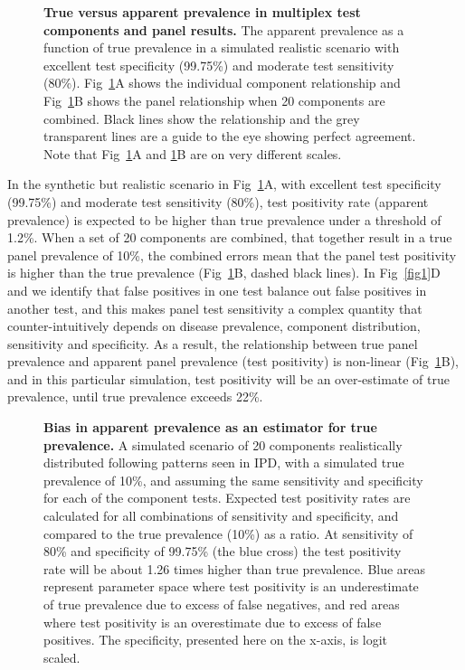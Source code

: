 \documentclass[10pt,letterpaper]{article}
\begin{document}
\begin{figure}[ht!]
\caption{{\bf True versus apparent prevalence in multiplex test components and panel results.}
The apparent prevalence as a function of true prevalence in a simulated realistic scenario with excellent test specificity (99.75\%) and moderate test sensitivity (80\%). Fig~\ref{fig3}A shows the individual component relationship and Fig~\ref{fig3}B shows the panel relationship when 20 components are combined. Black lines show the relationship and the grey transparent lines are a guide to the eye showing perfect agreement. Note that Fig~\ref{fig3}A and \ref{fig3}B are on very different scales.
}
\label{fig3}
\end{figure}

In the synthetic but realistic scenario in Fig~\ref{fig3}A, with excellent test specificity (99.75\%) and moderate test sensitivity (80\%), test positivity rate (apparent prevalence) is expected to be higher than true prevalence under a threshold of 1.2\%. When a set of 20 components are combined, that together result in a true panel prevalence of 10\%, the combined errors mean that the panel test positivity is higher than the true prevalence (Fig~\ref{fig3}B, dashed black lines). In Fig~\ref{fig1}D and  we identify that false positives in one test balance out false positives in another test, and this makes panel test sensitivity a complex quantity that counter-intuitively depends on disease prevalence, component distribution, sensitivity and specificity. As a result, the relationship between true panel prevalence and apparent panel prevalence (test positivity) is non-linear (Fig~\ref{fig3}B), and in this particular simulation, test positivity will be an over-estimate of true prevalence, until true prevalence exceeds 22\%.

\begin{figure}[ht!]
\caption{{\bf Bias in apparent prevalence as an estimator for true prevalence.}
A simulated scenario of 20 components realistically distributed following patterns seen in IPD, with a simulated true prevalence of 10\%, and assuming the same sensitivity and specificity for each of the component tests. Expected test positivity rates are calculated for all combinations of sensitivity and specificity, and compared to the true prevalence (10\%) as a ratio. At sensitivity of 80\% and specificity of 99.75\% (the blue cross) the test positivity rate will be about 1.26 times higher than true prevalence. Blue areas represent parameter space where test positivity is an underestimate of true prevalence due to excess of false negatives, and red areas where test positivity is an overestimate due to excess of false positives. The specificity, presented here on the x-axis, is logit scaled.}
\label{fig4}
\end{figure}
\end{document}
